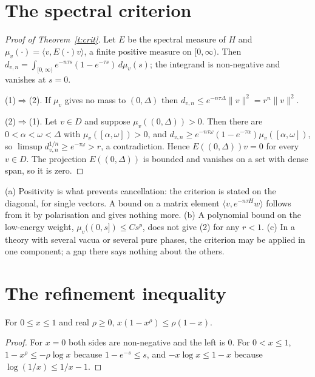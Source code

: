 \section{The spectral criterion}\label{s:crit}
\begin{proof}[Proof of Theorem~\ref{t:crit}]
Let $E$ be the spectral measure of $H$ and $\mu_v(\cdot)=\langle v,E(\cdot)v\rangle$, a finite positive measure
on $[0,\infty)$. Then $d_{v,n}=\int_{[0,\infty)}e^{-n\tau s}(1-e^{-\tau s})\,d\mu_v(s)$; the integrand is
non-negative and vanishes at $s=0$.

(1)$\Rightarrow$(2). If $\mu_v$ gives no mass to $(0,\Delta)$ then $d_{v,n}\le e^{-n\tau\Delta}\|v\|^2=r^n\|v\|^2$.

(2)$\Rightarrow$(1). Let $v\in D$ and suppose $\mu_v((0,\Delta))>0$. Then there are $0<\alpha<\omega<\Delta$ with
$\mu_v([\alpha,\omega])>0$, and $d_{v,n}\ge e^{-n\tau\omega}(1-e^{-\tau\alpha})\mu_v([\alpha,\omega])$, so
$\limsup d_{v,n}^{1/n}\ge e^{-\tau\omega}>r$, a contradiction. Hence $E((0,\Delta))v=0$ for every $v\in D$.
The projection $E((0,\Delta))$ is bounded and vanishes on a set with dense span, so it is zero.
\end{proof}

\begin{remark}\label{r:crit}
(a) Positivity is what prevents cancellation: the criterion is stated on the diagonal, for single vectors. A
bound on a matrix element $\langle v,e^{-n\tau H}w\rangle$ follows from it by polarisation and gives nothing
more. (b) A polynomial bound on the low-energy weight, $\mu_v((0,s])\le Cs^p$, does not give (2) for any
$r<1$. (c) In a theory with several vacua or several pure phases, the criterion may be applied in one
component; a gap there says nothing about the others.
\end{remark}

\section{The refinement inequality}\label{s:inh}
\begin{lemma}\label{l:scal}
For $0\le x\le1$ and real $\rho\ge0$, $x(1-x^\rho)\le\rho(1-x)$.
\end{lemma}
\begin{proof}
For $x=0$ both sides are non-negative and the left is $0$. For $0<x\le1$, $1-x^\rho\le-\rho\log x$ because
$1-e^{-s}\le s$, and $-x\log x\le1-x$ because $\log(1/x)\le1/x-1$.
\end{proof}

